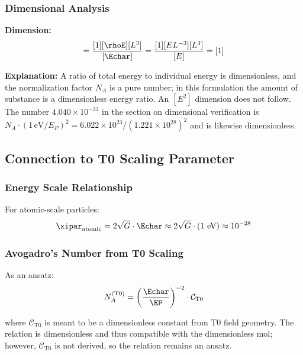 	\subsubsection{Dimensional Analysis}
	\label{subsubsec:mol_dimensional_analysis}
	
	\textbf{Dimension:}
	\begin{equation}
		[n_{\text{T0}}] = \frac{[1][\rhoE][L^3]}{[\Echar]} = \frac{[1][E L^{-3}][L^3]}{[E]} = [1]
		\label{eq:mol_true_dimension}
	\end{equation}
	
	\textbf{Explanation:} A ratio of total energy to individual energy is dimensionless, and the normalization factor $N_A$ is a pure number; in this formulation the amount of substance is a dimensionless energy ratio. An $[E^2]$ dimension does not follow. The number $4.040\times10^{-33}$ in the section on dimensional verification is $N_A \cdot (1\,\text{eV}/E_P)^2 = 6.022\times10^{23}/(1.221\times10^{28})^2$ and is likewise dimensionless.
	
	\subsection{Connection to T0 Scaling Parameter}
	\label{subsec:mol_t0_scaling}
	
	\subsubsection{Energy Scale Relationship}
	\label{subsubsec:mol_energy_scale}
	
	For atomic-scale particles:
	\begin{equation}
		\xipar_{\text{atomic}} = 2\sqrt{G} \cdot \Echar \approx 2\sqrt{G} \cdot (1 \text{ eV}) \approx 10^{-28}
		\label{eq:xi_atomic}
	\end{equation}
	
	\subsubsection{Avogadro's Number from T0 Scaling}
	\label{subsubsec:avogadro_t0}
	
	As an ansatz:
	\begin{equation}
		N_A^{(\text{T0})} = \left(\frac{\Echar}{\EP}\right)^{-2} \cdot \mathcal{C}_{\text{T0}}
		\label{eq:avogadro_t0_prediction}
	\end{equation}
	
	where $\mathcal{C}_{\text{T0}}$ is meant to be a dimensionless constant from T0 field geometry. The relation is dimensionless and thus compatible with the dimensionless mol; however, $\mathcal{C}_{\text{T0}}$ is not derived, so the relation remains an ansatz.
	
